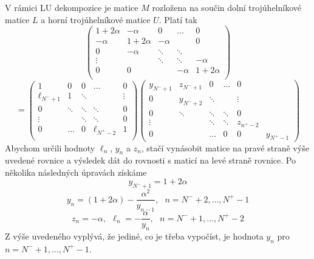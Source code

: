 \documentclass[a4paper]{book}
\begin{document}
V rámici LU dekompozice je matice $M$ rozložena na součin dolní trojúhelníkové matice $L$ a horní trojúhelníkové matice $U$. Platí tak
\begin{equation*}
	\begin{pmatrix}
		1 + 2 \alpha & - \alpha & 0 & \dots & 0 \\
		-\alpha & 1 + 2 \alpha & - \alpha & & 0\\
		0 & -\alpha & \ddots & \ddots & \\
		\vdots & & \ddots & \ddots & -\alpha \\
		0 & 0 & & -\alpha & 1 + 2 \alpha \\
	\end{pmatrix}
\end{equation*}
\begin{equation}
	=
	\begin{pmatrix}
		1 & 0 & 0 & \dots & 0 \\
		\ell_{N^{-} + 1} & 1 & \ddots & & \vdots \\
		0 & \ddots & \ddots & \ddots & 0 \\
		\vdots & & \ddots & \ddots & 0 \\
		0 & \dots & 0 & \ell_{N^{+}-2} & 1 \\
	\end{pmatrix}
	\begin{pmatrix}
		y_{N^{-}+1} & z_{N^{-}+1} & 0 & \dots & 0 \\
		0 & y_{N^{-} + 2} & \ddots & & \vdots \\
		0 & \ddots & \ddots & \ddots & 0 \\
		\vdots & & \ddots & \ddots & z_{n^{+} - 2} \\
		0 & & \dots & 0 & 0 & y_{N^{+}-1}
	\end{pmatrix}
\end{equation}
Abychom určili hodnoty $\ell_n$, $y_n$ a $z_n$, stačí vynásobit matice na pravé straně výše uvedené rovnice a výsledek dát do rovnosti s maticí na levé straně rovnice. Po několika následných úpravách získáme
\begin{equation*}
y_{N^{-}+1} = 1 + 2 \alpha
\end{equation*}
\begin{equation*}
y_n = (1 + 2 \alpha) -\frac{\alpha^2}{y_{n-1}},~~~n = N^{-} + 2, \dots, N^{+} - 1
\end{equation*}
\begin{equation}
z_n = -\alpha,~~ \ell_n = -\frac{\alpha}{y_n},~~~ n = N^{-} + 1, \dots, N^{+} - 2
\end{equation}
Z výše uvedeného vyplývá, že jediné, co je třeba vypočíst, je hodnota $y_n$ pro $n = N^{-} + 1, \dots, N^{+} - 1$.
\end{document}
